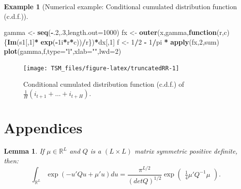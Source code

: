 \documentclass[
  12pt,
]{book}
\newenvironment{Shaded}{\begin{snugshade}}{\end{snugshade}}
\newcommand{\AttributeTok}[1]{\textcolor[rgb]{0.13,0.29,0.53}{#1}}
\newcommand{\ControlFlowTok}[1]{\textcolor[rgb]{0.13,0.29,0.53}{\textbf{#1}}}
\newcommand{\DecValTok}[1]{\textcolor[rgb]{0.00,0.00,0.81}{#1}}
\newcommand{\FunctionTok}[1]{\textcolor[rgb]{0.13,0.29,0.53}{\textbf{#1}}}
\newcommand{\NormalTok}[1]{#1}
\newcommand{\OtherTok}[1]{\textcolor[rgb]{0.56,0.35,0.01}{#1}}
\newcommand{\SpecialCharTok}[1]{\textcolor[rgb]{0.81,0.36,0.00}{\textbf{#1}}}
\newcommand{\StringTok}[1]{\textcolor[rgb]{0.31,0.60,0.02}{#1}}
\newtheorem{lemma}{Lemma}[chapter]
\theoremstyle{definition}
\theoremstyle{definition}
\newtheorem{example}{Example}[chapter]
\theoremstyle{definition}
\theoremstyle{definition}
\theoremstyle{remark}
\begin{document}
\begin{example}[Numerical example: Conditional cumulated distribution function (c.d.f.)]
\begin{Shaded}
\begin{Highlighting}[]
\NormalTok{gamma }\OtherTok{\textless{}{-}} \FunctionTok{seq}\NormalTok{(}\SpecialCharTok{{-}}\NormalTok{.}\DecValTok{2}\NormalTok{,.}\DecValTok{3}\NormalTok{,}\AttributeTok{length.out=}\DecValTok{1000}\NormalTok{)}
\NormalTok{fx }\OtherTok{\textless{}{-}} \FunctionTok{outer}\NormalTok{(x,gamma,}\ControlFlowTok{function}\NormalTok{(r,c)\{}\FunctionTok{Im}\NormalTok{(s1[,}\DecValTok{1}\NormalTok{]}\SpecialCharTok{*}
                                       \FunctionTok{exp}\NormalTok{(}\SpecialCharTok{{-}}\NormalTok{1i}\SpecialCharTok{*}\NormalTok{r}\SpecialCharTok{*}\NormalTok{c))}\SpecialCharTok{/}\NormalTok{r\})}\SpecialCharTok{*}\NormalTok{dx[,}\DecValTok{1}\NormalTok{]}
\NormalTok{f  }\OtherTok{\textless{}{-}} \DecValTok{1}\SpecialCharTok{/}\DecValTok{2} \SpecialCharTok{{-}} \DecValTok{1}\SpecialCharTok{/}\NormalTok{pi }\SpecialCharTok{*} \FunctionTok{apply}\NormalTok{(fx,}\DecValTok{2}\NormalTok{,sum)}
\FunctionTok{plot}\NormalTok{(gamma,f,}\AttributeTok{type=}\StringTok{"l"}\NormalTok{,}\AttributeTok{xlab=}\StringTok{""}\NormalTok{,}\AttributeTok{lwd=}\DecValTok{2}\NormalTok{)}
\end{Highlighting}
\end{Shaded}

\begin{figure}
\texttt{[image: TSM\_files/figure-latex/truncatedRR-1]} \caption{Conditional cumulated distribution function (c.d.f.) of $\frac{1}{H}(i_{t+1}+\dots+i_{t+H})$.}\label{fig:truncatedRR}
\end{figure}

\end{example}

\hypertarget{appendices}{%
\section{Appendices}\label{appendices}}

\begin{lemma}
\protect\hypertarget{lem:integralQuadratic}{}\label{lem:integralQuadratic}If \(\mu \in \mathbb{R}^L\) and \(Q\) is a \((L \times L)\) matrix symmetric positive definite, then:
\[
\int_{\mathbb{R}^{L}} \exp(-u'Q u + \mu'u)du =
\frac{\pi^{L/2}}{(det   Q)^{1/2}} \exp \left(
\begin{array}{l}  \frac{1}{4} \mu'Q^{-1}\mu \end{array} \right).
\]
\end{lemma}
\end{document}
